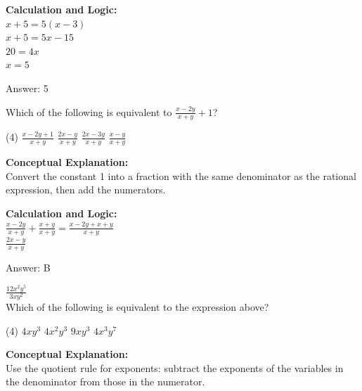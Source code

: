 \documentclass[11pt,paper=a4,answers]{exam}
\begin{document}
\begin{questions}
\begin{solution}
\vspace{20pt}

\textbf{Calculation and Logic:} \\
$x + 5 = 5(x - 3)$ \\
$x + 5 = 5x - 15$ \\
$20 = 4x$ \\
$x = 5$

\vspace{25pt}

Answer: \colorbox{yellow!100}{5}
\end{solution}

\vspace{40pt}

\question
Which of the following is equivalent to $\frac{x-2y}{x+y} + 1$?
\begin{tasks}(4)
    \task $\frac{x-2y+1}{x+y}$
    \task $\frac{2x-y}{x+y}$
    \task $\frac{2x-3y}{x+y}$
    \task $\frac{x-y}{x+y}$
\end{tasks}

\begin{solution}
\textbf{Conceptual Explanation:} \\
Convert the constant 1 into a fraction with the same denominator as the rational expression, then add the numerators.

\vspace{20pt}

\textbf{Calculation and Logic:} \\
$\frac{x-2y}{x+y} + \frac{x+y}{x+y} = \frac{x - 2y + x + y}{x+y}$ \\
$\frac{2x - y}{x+y}$

\vspace{25pt}

Answer: \colorbox{yellow!100}{B}
\end{solution}

\vspace{40pt}

\question
$\frac{12x^2 y^5}{3xy^2}$ \\
Which of the following is equivalent to the expression above?
\begin{tasks}(4)
    \task $4xy^3$
    \task $4x^2y^3$
    \task $9xy^3$
    \task $4x^3y^7$
\end{tasks}

\begin{solution}
\textbf{Conceptual Explanation:} \\
Use the quotient rule for exponents: subtract the exponents of the variables in the denominator from those in the numerator.


\end{solution}
\end{questions}
\end{document}
